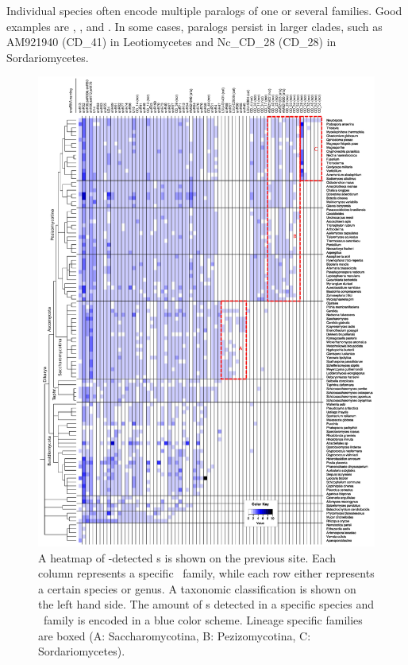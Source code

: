 Individual species often encode multiple paralogs of one or several
families. Good examples are \Ppl, \Asp, and \Nfu. In some cases, paralogs
persist in larger clades, such as AM921940 (CD\_41) in Leotiomycetes and
Nc\_CD\_28 (CD\_28) in Sordariomycetes.

\begin{figure}
  \vspace{-1cm}
  \centering
  \includegraphics[width=1.05\textwidth]{pics/CD_snoRNAs_collapsed.short_naming.rotated.eps}
  \caption{A heatmap of
    \snostrip-detected \cd s is shown on the previous site. Each column represents a specific \sno\
    family, while each row either represents a certain species or
    genus. A taxonomic classification is shown on the left hand side. The amount of
    \sno s detected in a specific species and \sno\ family is encoded in a
    blue color scheme. Lineage specific families are boxed (A:
    Saccharomycotina, B: Pezizomycotina, C: Sordariomycetes). %
  }
  \label{fig:heatmap_CD_snoRNAs} 
\end{figure}

